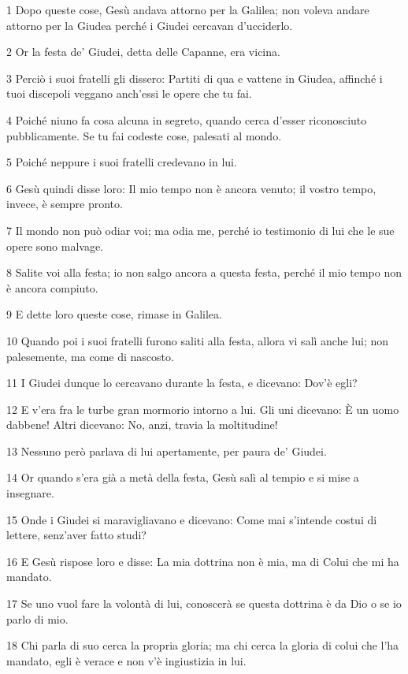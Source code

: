 \par 1 Dopo queste cose, Gesù andava attorno per la Galilea; non voleva andare attorno per la Giudea perché i Giudei cercavan d'ucciderlo.
\par 2 Or la festa de' Giudei, detta delle Capanne, era vicina.
\par 3 Perciò i suoi fratelli gli dissero: Partiti di qua e vattene in Giudea, affinché i tuoi discepoli veggano anch'essi le opere che tu fai.
\par 4 Poiché niuno fa cosa alcuna in segreto, quando cerca d'esser riconosciuto pubblicamente. Se tu fai codeste cose, palesati al mondo.
\par 5 Poiché neppure i suoi fratelli credevano in lui.
\par 6 Gesù quindi disse loro: Il mio tempo non è ancora venuto; il vostro tempo, invece, è sempre pronto.
\par 7 Il mondo non può odiar voi; ma odia me, perché io testimonio di lui che le sue opere sono malvage.
\par 8 Salite voi alla festa; io non salgo ancora a questa festa, perché il mio tempo non è ancora compiuto.
\par 9 E dette loro queste cose, rimase in Galilea.
\par 10 Quando poi i suoi fratelli furono saliti alla festa, allora vi salì anche lui; non palesemente, ma come di nascosto.
\par 11 I Giudei dunque lo cercavano durante la festa, e dicevano: Dov'è egli?
\par 12 E v'era fra le turbe gran mormorio intorno a lui. Gli uni dicevano: È un uomo dabbene! Altri dicevano: No, anzi, travia la moltitudine!
\par 13 Nessuno però parlava di lui apertamente, per paura de' Giudei.
\par 14 Or quando s'era già a metà della festa, Gesù salì al tempio e si mise a insegnare.
\par 15 Onde i Giudei si maravigliavano e dicevano: Come mai s'intende costui di lettere, senz'aver fatto studi?
\par 16 E Gesù rispose loro e disse: La mia dottrina non è mia, ma di Colui che mi ha mandato.
\par 17 Se uno vuol fare la volontà di lui, conoscerà se questa dottrina è da Dio o se io parlo di mio.
\par 18 Chi parla di suo cerca la propria gloria; ma chi cerca la gloria di colui che l'ha mandato, egli è verace e non v'è ingiustizia in lui.
